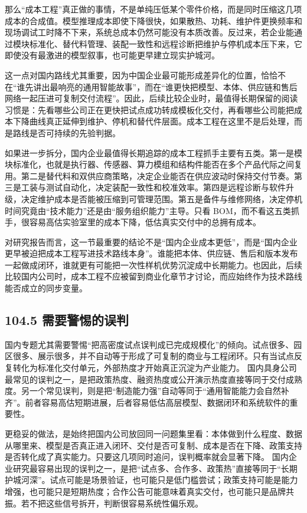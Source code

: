 那么“成本工程”真正做的事情，不是单纯压低某个零件价格，而是同时压缩这几项成本的合成值。模型推理成本即使下降很快，如果散热、功耗、维护件更换频率和现场调试工时降不下来，系统总成本仍然可能没有本质改善。反过来，若企业能通过模块标准化、替代料管理、装配一致性和远程诊断把维护与停机成本压下来，它即使没有最激进的模型叙事，也可能更早建立现实护城河。

这一点对国内路线尤其重要，因为中国企业最可能形成差异化的位置，恰恰不在“谁先讲出最响亮的通用智能故事”，而在“谁更快把模型、本体、供应链和售后网络一起压进可复制交付流程”。因此，后续比较企业时，最值得长期保留的阅读习惯是：先看哪些公司正在更快把试点成功转成模板化交付，再看哪些公司能把成本下降曲线真正延伸到维护、停机和替代件层面。成本工程在这里不是后处理，而是路线是否可持续的先验判据。

如果进一步拆分，国内企业最值得长期追踪的成本工程抓手主要有五类。第一是模块标准化，也就是执行器、传感器、算力模组和结构件能否在多个产品代际之间复用。第二是替代料和双供应商策略，决定企业能否在供应波动时保持交付节奏。第三是工装与测试自动化，决定装配一致性和校准效率。第四是远程诊断与软件升级，决定维护成本是否能被压缩到可管理范围。第五是备件与维修网络，决定停机时间究竟由“技术能力”还是由“服务组织能力”主导。只看 BOM，而不看这五类抓手，很容易高估实验室里的成本下降，低估真实交付中的总拥有成本。

对研究报告而言，这一节最重要的结论不是“国内企业成本更低”，而是“国内企业更早被迫把成本工程写进技术路线本身”。谁能把本体、供应链、售后和版本发布一起做成闭环，谁就更有可能把一次性样机优势沉淀成中长期能力。也因此，后续比较国内公司时，成本工程不应被留到商业化章节才讨论，而应始终作为技术路线能否成立的同步变量。

\subsection*{104.5 需要警惕的误判}


国内专题尤其需要警惕“把高密度试点误判成已完成规模化”的倾向。试点很多、园区很多、展示很多，并不自动等于形成了可复制的商业与工程闭环。只有当试点反复转化为标准化交付单元，外部热度才开始真正沉淀为产业能力。 国内具身公司最常见的误判之一，是把政策热度、融资热度或公开演示热度直接等同于交付成熟度。另一个常见误判，则是把“制造能力强”自动等同于“通用智能能力会自然补齐”。前者容易高估短期进展，后者容易低估高层模型、数据闭环和系统软件的重要性。

更稳妥的做法，是始终把国内公司放回同一问题集里看：本体做到什么程度、数据从哪里来、模型是否真正进入闭环、交付是否可复制、成本是否在下降、政策支持是否转化成了真实能力。只要这几项同时追问，误判概率就会显著下降。 国内企业研究最容易出现的误判之一，是把“试点多、合作多、政策热”直接等同于“长期护城河深”。试点可能是场景验证，也可能只是低门槛尝试；政策支持可能是能力增强，也可能只是短期热度；合作公告可能意味着真实交付，也可能只是品牌共振。若不把这些信号拆开，判断很容易系统性偏乐观。

